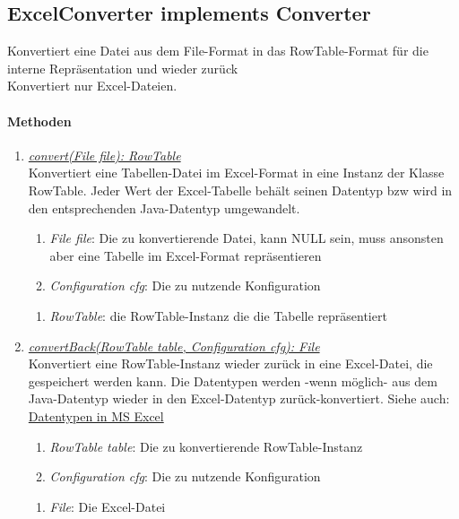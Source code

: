 \subsection{ExcelConverter implements Converter}
Konvertiert eine Datei aus dem File-Format in das RowTable-Format für die interne Repräsentation und wieder zurück \\

Konvertiert nur Excel-Dateien. \\

\paragraph{Methoden}
\begin{enumerate}[+]
	\item \underline{\textit{convert(File file): RowTable}} \\
	Konvertiert eine Tabellen-Datei im Excel-Format in eine Instanz der Klasse RowTable.
	Jeder Wert der Excel-Tabelle behält seinen Datentyp bzw wird in den entsprechenden Java-Datentyp umgewandelt.
	
	\begin{enumerate}[$\bullet$]
		\item \textit{File file}: Die zu konvertierende Datei, kann NULL sein, muss ansonsten aber eine Tabelle im Excel-Format repräsentieren
		\item \textit{Configuration cfg}: Die zu nutzende Konfiguration
	\end{enumerate}
	\vspace{-0.2cm}
	\begin{enumerate}[$\circ$]
		\item \textit{RowTable}: die RowTable-Instanz die die Tabelle repräsentiert
	\end{enumerate}
	
	\item \underline{\textit{convertBack(RowTable table, Configuration cfg): File}} \\
	Konvertiert eine RowTable-Instanz wieder zurück in eine Excel-Datei, die gespeichert werden kann.
	Die Datentypen werden -wenn möglich- aus dem Java-Datentyp wieder in den Excel-Datentyp zurück-konvertiert.
	Siehe auch: \href{https://support.office.com/en-us/article/data-types-in-data-models-e2388f62-6122-4e2b-bcad-053e3da9ba90#__toc327893213}{Datentypen in MS Excel}
	\begin{enumerate}[$\bullet$]
		\item \textit{RowTable table}: Die zu konvertierende RowTable-Instanz
		\item \textit{Configuration cfg}: Die zu nutzende Konfiguration
	\end{enumerate}
	\vspace{-0.2cm}
	\begin{enumerate}[$\circ$]
		\item \textit{File}: Die Excel-Datei
	\end{enumerate}
\end{enumerate}

